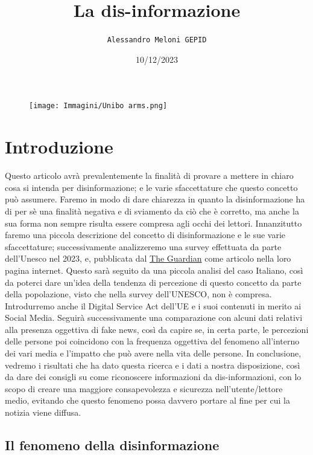 \documentclass{article}
\title{\Huge\textbf{La dis-informazione}}
\author{\texttt{Alessandro Meloni GEPID}}
\date{10/12/2023}
\begin{document}
\begin{figure}
    \centering
    \texttt{[image: Immagini/Unibo arms.png]}
\end{figure}
    \maketitle
\centering\tableofcontents
\newpage \section{Introduzione}
\flushleft
\begin{justify}
    Questo articolo avrà prevalentemente la finalità di provare a mettere in chiaro cosa si intenda per disinformazione; e le varie sfaccettature che questo concetto può assumere.
    Faremo in modo di dare chiarezza in quanto la disinformazione ha di per sè una finalità negativa e di sviamento da ciò che è corretto, ma anche la sua forma non sempre risulta essere compresa agli occhi dei lettori.
    Innanzitutto faremo una piccola descrizione del concetto di disinformazione e le sue varie sfaccettature; successivamente analizzeremo una survey effettuata da parte dell'Unesco nel 2023, e, pubblicata dal \href{https://www.theguardian.com/technology/2023/nov/07/85-of-people-worry-about-online-disinformation-global-survey-finds}{The Guardian}\label{:articolo} come articolo nella loro pagina internet. Questo sarà seguito da una piccola analisi del caso Italiano, così da poterci dare un'idea della tendenza di percezione di questo concetto da parte della popolazione, visto che nella survey dell'UNESCO, non è compresa.
    Introdurremo anche il Digital Service Act dell'UE e i suoi contenuti in merito ai Social Media.
    Seguirà successivamente una comparazione con alcuni dati relativi alla presenza oggettiva di fake news, così da capire se, in certa parte, le percezioni delle persone poi coincidono con la frequenza oggettiva del fenomeno all'interno dei vari media e l'impatto che può avere nella vita delle persone.
    In conclusione, vedremo i risultati che ha dato questa ricerca e i dati a nostra disposizione, così da dare dei consigli su come riconoscere informazioni da dis-informazioni, con lo scopo di creare una maggiore consapevolezza e sicurezza nell'utente/lettore medio, evitando che questo fenomeno possa davvero portare al fine per cui la notizia viene diffusa.
\end{justify}

\begin{center}
\section{Il fenomeno della disinformazione}
\end{center}
\end{document}
